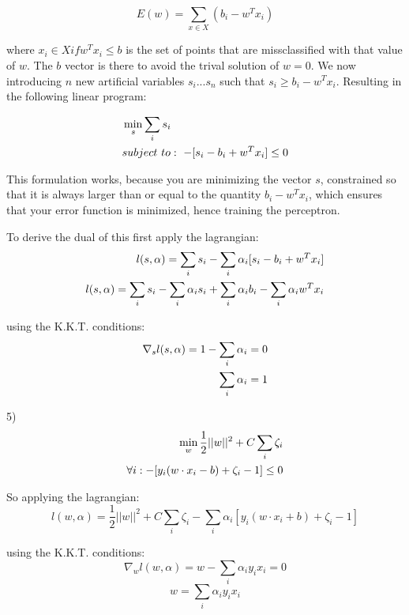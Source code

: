 \documentclass[12pt]{article}
\begin{document}
\begin{equation}
    E(w) = \sum_{x \in X}(b_i-w^Tx_i)
\end{equation}

where $x_i \in X if w^Tx_i \leq b$ is the set of points that are missclassified with that value of $w$. 
The $b$ vector is there to avoid the trival solution of $w=0$. We now introducing $n$ new
artificial variables $s_i...s_n$ such that $s_i \geq b_i - w^Tx_i$. Resulting in the 
following linear program: 

\begin{align}
    &\min_s \sum_i s_i \notag \\
    &subject\ to:\ -[s_i - b_i + w^Tx_i]\leq 0
\end{align}

This formulation works, because you are minimizing the vector $s$, constrained so that
it is always larger than or equal to the quantity $b_i -w^Tx_i$, which ensures that 
your error function is minimized, hence training the perceptron. 

To derive the dual of this first apply the lagrangian: 
\begin{align}
    l(s,\alpha) = \sum_i s_i - \sum_i \alpha_i[s_i - b_i + w^Tx_i] \notag \\
    l(s,\alpha) = \sum_i s_i - \sum_i \alpha_i s_i +\sum_i \alpha_i b_i - \sum_i \alpha_i w^Tx_i
\end{align}

using the K.K.T. conditions: 
\begin{align}
    \nabla_s l(s,\alpha) = 1 - \sum_i \alpha_i = 0 \notag \\
    \sum_i \alpha_i = 1
\end{align}

\pagebreak
\setcounter{equation}{0}
5)
\begin{align}
    \min_w \frac{1}{2}||w||^2 + C\sum_i \zeta_i \notag \\
    \forall i: -[y_i(w \cdot x_i - b) + \zeta_i -1] \leq 0
\end{align}

So applying the lagrangian: 
\begin{equation}
    l(w,\alpha) = \frac{1}{2}||w||^2 + C\sum_i \zeta_i - \sum_i \alpha_i[y_i(w \cdot x_i + b) + \zeta_i -1]
\end{equation}

using the K.K.T. conditions: 
\begin{equation}
    \nabla_w l(w,\alpha) = w - \sum_i \alpha_iy_ix_i = 0 
\end{equation}
\begin{equation}
    w = \sum_i \alpha_i y_i x_i
\end{equation}
\end{document}
